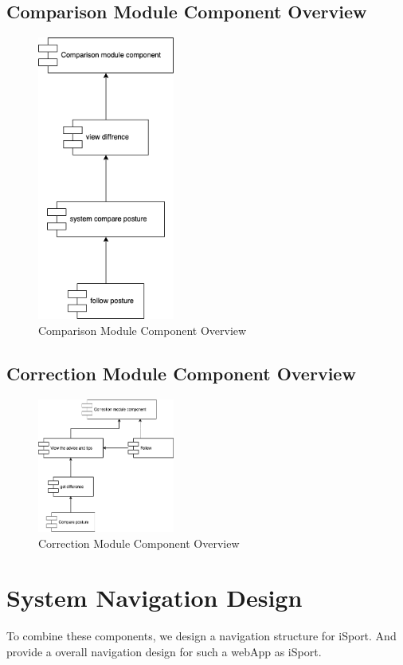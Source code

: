 \documentclass[16pt]{scrreprt}
\begin{document}
\subsection{Comparison Module Component Overview}
\begin{figure}[H]
    \centering
    \includegraphics[width=0.4\textwidth]{diagrams/comparison.png}
    \caption{Comparison Module Component Overview}
\end{figure}


\subsection{Correction Module Component Overview}
\begin{figure}[H]
    \centering
    \includegraphics[width=0.4\textwidth]{diagrams/correction.png}
    \caption{Correction Module Component Overview}
\end{figure}

\section{System Navigation Design}
To combine these components, we design a navigation structure for iSport. And provide a overall navigation design for such a webApp as iSport. \\
\end{document}
